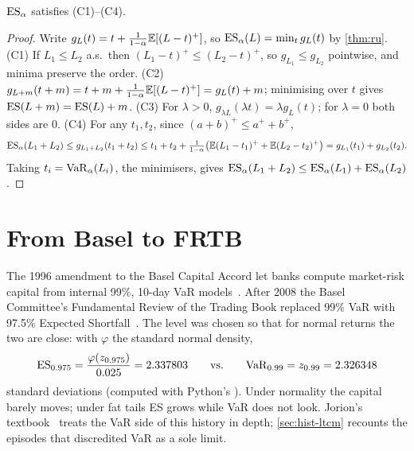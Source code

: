 \begin{theorem}\label{thm:escoherent}
$\mathrm{ES}_\alpha$ satisfies (C1)--(C4).
\end{theorem}
\begin{proof}
Write $g_L(t)=t+\frac1{1-\alpha}\mathbb{E}[(L-t)^+]$, so $\mathrm{ES}_\alpha(L)=\min_t g_L(t)$ by \cref{thm:ru}.
(C1) If $L_1\le L_2$ a.s.\ then $(L_1-t)^+\le(L_2-t)^+$, so $g_{L_1}\le g_{L_2}$ pointwise, and minima preserve the order.
(C2) $g_{L+m}(t+m)=t+m+\frac1{1-\alpha}\mathbb{E}[(L-t)^+]=g_L(t)+m$; minimising over $t$ gives $\mathrm{ES}(L+m)=\mathrm{ES}(L)+m$.
(C3) For $\lambda>0$, $g_{\lambda L}(\lambda t)=\lambda g_L(t)$; for $\lambda=0$ both sides are $0$.
(C4) For any $t_1,t_2$, since $(a+b)^+\le a^++b^+$,
\[ \mathrm{ES}_\alpha(L_1+L_2)\le g_{L_1+L_2}(t_1+t_2)\le t_1+t_2+\tfrac1{1-\alpha}\bigl(\mathbb{E}(L_1-t_1)^++\mathbb{E}(L_2-t_2)^+\bigr)=g_{L_1}(t_1)+g_{L_2}(t_2). \]
Taking $t_i=\mathrm{VaR}_\alpha(L_i)$, the minimisers, gives $\mathrm{ES}_\alpha(L_1+L_2)\le\mathrm{ES}_\alpha(L_1)+\mathrm{ES}_\alpha(L_2)$.
\end{proof}


\section{From Basel to FRTB}
The 1996 amendment to the Basel Capital Accord let banks compute market-risk capital from internal 99\%, 10-day VaR
models~\cite{bcbs1996amendment}. After 2008 the Basel Committee's Fundamental Review of the Trading Book replaced
99\% VaR with 97.5\% Expected Shortfall~\cite{bcbs2019frtb}. The level was chosen so that for normal returns the two are
close: with $\varphi$ the standard normal density,
\[ \mathrm{ES}_{0.975}=\frac{\varphi(z_{0.975})}{0.025}=2.337803 \qquad\text{vs.}\qquad \mathrm{VaR}_{0.99}=z_{0.99}=2.326348 \]
standard deviations (computed with Python's ). Under normality the capital barely moves;
under fat tails ES grows while VaR does not look. Jorion's textbook~\cite{jorion2007var} treats the VaR side of this
history in depth; \cref{sec:hist-ltcm} recounts the episodes that discredited VaR as a sole limit.

